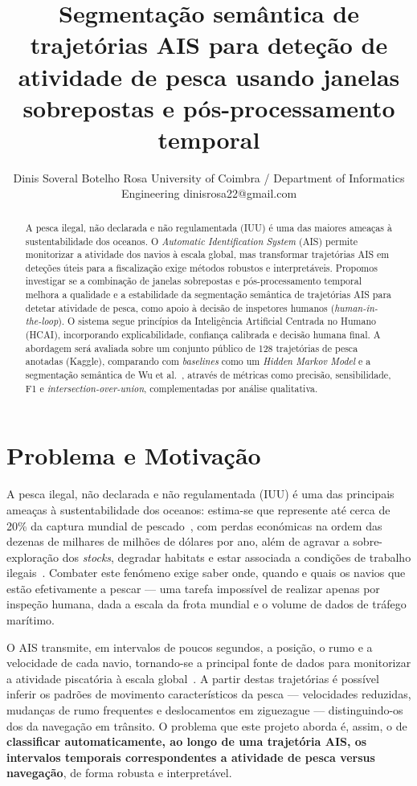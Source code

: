 \documentclass{article}
\title{Segmenta\c{c}\~ao sem\^antica de trajet\'orias AIS para dete\c{c}\~ao de atividade de pesca usando janelas sobrepostas e p\'os-processamento temporal}
\author{
    Dinis Soveral Botelho Rosa
    \affiliations
    University of Coimbra / Department of Informatics Engineering
    \emails
    dinisrosa22@gmail.com
}
\begin{document}
\maketitle

\begin{abstract}
A pesca ilegal, n\~ao declarada e n\~ao regulamentada (IUU) \'e uma das maiores
amea\c{c}as \`a sustentabilidade dos oceanos. O \emph{Automatic Identification
System} (AIS) permite monitorizar a atividade dos navios \`a escala global, mas
transformar trajet\'orias AIS em dete\c{c}\~oes \'uteis para a fiscaliza\c{c}\~ao
exige m\'etodos robustos e interpret\'aveis. Propomos investigar se a combina\c{c}\~ao de janelas sobrepostas e
p\'os-processamento temporal melhora a qualidade e a estabilidade da segmenta\c{c}\~ao
sem\^antica de trajet\'orias AIS para detetar atividade de pesca, como apoio \`a
decis\~ao de inspetores humanos (\emph{human-in-the-loop}). O sistema segue princ\'ipios
da Intelig\^encia Artificial Centrada no Humano (HCAI), incorporando explicabilidade,
confian\c{c}a calibrada e decis\~ao humana final.
A abordagem ser\'a avaliada sobre um conjunto p\'ublico de 128 trajet\'orias de pesca
anotadas (Kaggle), comparando com \emph{baselines} como um \emph{Hidden Markov Model} e
a segmenta\c{c}\~ao sem\^antica de Wu et al.~\cite{wu2022}, atrav\'es de m\'etricas como
precis\~ao, sensibilidade, F1 e \emph{intersection-over-union}, complementadas por
an\'alise qualitativa.
\end{abstract}

\section{Problema e Motiva\c{c}\~ao}
\label{sec:problema-motivacao}

A pesca ilegal, n\~ao declarada e n\~ao regulamentada (IUU) \'e uma das principais
amea\c{c}as \`a sustentabilidade dos oceanos: estima-se que represente at\'e cerca de
20\% da captura mundial de pescado~\cite{agnew2009}, com perdas econ\'omicas na ordem das dezenas de
milhares de milh\~oes de d\'olares por ano, al\'em de agravar a sobre-explora\c{c}\~ao
dos \emph{stocks}, degradar habitats e estar associada a condi\c{c}\~oes de trabalho
ilegais~\cite{chuaysi2020}. Combater este fen\'omeno exige saber onde, quando e quais os
navios que est\~ao efetivamente a pescar --- uma tarefa imposs\'ivel de realizar apenas
por inspe\c{c}\~ao humana, dada a escala da frota mundial e o volume de dados de
tr\'afego mar\'itimo.

O AIS transmite, em intervalos de poucos segundos, a posi\c{c}\~ao, o rumo e a
velocidade de cada navio, tornando-se a principal fonte de dados para monitorizar a
atividade piscat\'oria \`a escala global~\cite{natale2015,kroodsma2018}. A partir destas
trajet\'orias \'e poss\'ivel inferir os padr\~oes de movimento caracter\'isticos da
pesca --- velocidades reduzidas, mudan\c{c}as de rumo frequentes e deslocamentos em
ziguezague --- distinguindo-os dos da navega\c{c}\~ao em tr\^ansito. O problema que este
projeto aborda \'e, assim, o de \textbf{classificar automaticamente, ao longo de uma
trajet\'oria AIS, os intervalos temporais correspondentes a atividade de pesca versus
navega\c{c}\~ao}, de forma robusta e interpret\'avel.
\end{document}
